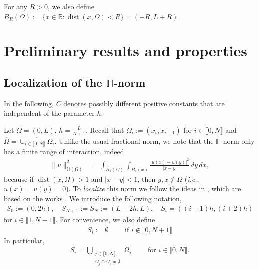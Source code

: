 \documentclass[10 pt]{article}
\newcommand\inter[1]{\llbracket #1\rrbracket}
\numberwithin{equation}{section}
\def\dist{\operatorname{dist}}
\def\R{\mathbb{R}}
\begin{document}
For any $R>0$, we also define $B_{R}(\Omega):=\{x\in\R:\dist(x,\Omega)<R\}=(-R,L+R)$.


\section{Preliminary results and properties}\label{sec:three}

\subsection{Localization of the $\mathbb{H}$-norm}\label{sec:localization-norm}

In the following, $C$ denotes possibly different positive constants that are independent of the parameter $h$. 

Let $\Omega=(0,L)$, $h=\frac{L}{N+1}$. Recall that $\Omega_i:=(x_{i},x_{i+1})$ for $i\in\inter{0,N}$ and $\overline{\Omega}=\overline{\cup_{i\in\inter{0,N}}\Omega_i}$. Unlike the usual fractional norm, we note that the $\mathbb H$-norm only has a finite range of interaction, indeed
%
\begin{align}\label{eq:norm_R_bound}
    \|u\|^2_{\mathbb H(\Omega)} &=\int_{B_1(\Omega)}\int_{B_1(x)}\frac{|u(x)-u(y)|^2}{|x-y|}\, dy\, dx,
\end{align}
%
because if $\dist(x,\Omega)>1$ and $|x-y|<1$, then $y,x\not\in \Omega$ (\emph{i.e.}, $u(x)=u(y)=0$).  To \emph{localize} this norm we follow the ideas in \cite{Bor17}, which are based on the works \cite{Fae00,Fae02}. We introduce the following notation,
\begin{align}\label{eq:def_Si}
S_0:=(0,2h),\quad S_{N+1}:=S_{N}:=(L-2h,L),\quad S_{i}=((i-1)h,(i+2)h)
\end{align}
for $i\in \inter{1,N-1}$.  For convenience, we also define 
\begin{align*}
S_i:=\emptyset \qquad \text{ if }i\not\in\inter{0,N+1}
\end{align*}
In particular, 
\begin{align*}
    S_i=\bigcup_
    {
    {\substack{j\in\inter{0,N},\\ \overline{\Omega_j}\cap \overline{\Omega_i}\neq \emptyset}}
    }\Omega_j \qquad \text{ for } i\in\inter{0,N}.
\end{align*}
\end{document}
